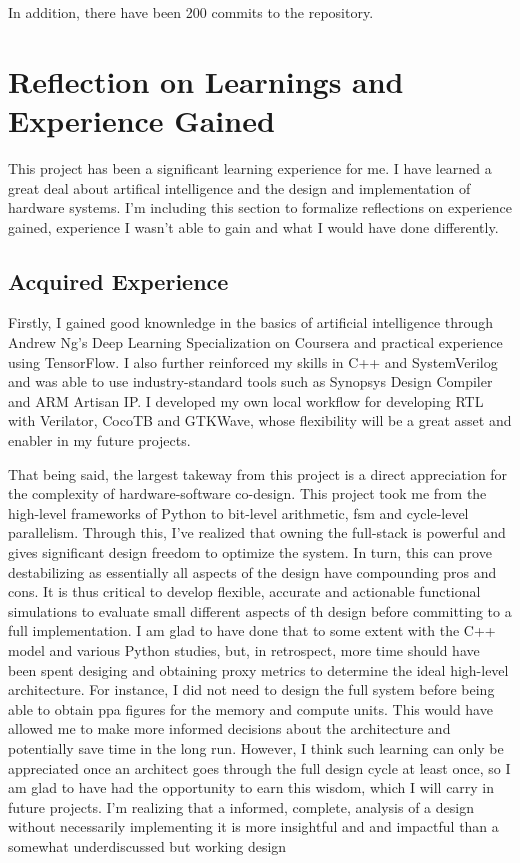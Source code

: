 In addition, there have been 200 commits to the repository.

\newpage
\section{Reflection on Learnings and Experience Gained}
This project has been a significant learning experience for me. I have learned a great deal about artifical intelligence and the design and implementation of hardware systems.
I'm including this section to formalize reflections on experience gained, experience I wasn't able to gain and what I would have done differently.

\subsection{Acquired Experience}
Firstly, I gained good knownledge in the basics of artificial intelligence through Andrew Ng's Deep Learning Specialization on Coursera and practical experience using TensorFlow.
I also further reinforced my skills in C++ and SystemVerilog and was able to use industry-standard tools such as Synopsys Design Compiler and ARM Artisan IP. I developed my own
local workflow for developing RTL with Verilator, CocoTB and GTKWave, whose flexibility will be a great asset and enabler in my future projects.

That being said, the largest takeway from this project is a direct appreciation for the complexity of hardware-software co-design. This project took me from the high-level frameworks
of Python to bit-level arithmetic, \ac{fsm} and cycle-level parallelism. Through this, I've realized that owning the full-stack is powerful and gives significant design freedom to optimize
the system. In turn, this can prove destabilizing as essentially all aspects of the design have compounding pros and cons. It is thus critical to develop flexible, accurate and actionable
functional simulations to evaluate small different aspects of th design before committing to a full implementation. I am glad to have done that to some extent with the C++ model 
and various Python studies, but, in retrospect, more time should have been spent desiging and obtaining proxy metrics to determine the ideal high-level architecture. For instance, I 
did not need to design the full system before being able to obtain \ac{ppa} figures for the memory and compute units. This would have allowed me to make more informed decisions about
the architecture and potentially save time in the long run. However, I think such learning can only be appreciated once an architect goes through the full design cycle at least once,
so I am glad to have had the opportunity to earn this wisdom, which I will carry in future projects. I'm realizing that a informed, complete, analysis of a design without necessarily
implementing it is more insightful and and impactful than a somewhat underdiscussed but working design

